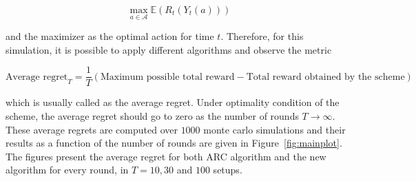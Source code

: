 \documentclass[11pt]{article}
\newcommand{\E}{\mathbb{E}}
\newcommand{\Acal}{\mathcal{A}}
\begin{document}
$$
\max_{a \in \Acal} \E(R_t(Y_t(a)))
$$

\noindent and the maximizer as the optimal action for time $t$. Therefore, for this simulation, it is possible to apply different algorithms and observe the metric 

$$
\text{Average regret}_T = \dfrac{1}{T} \left( \text{Maximum possible total reward} - \text{Total reward obtained by the scheme} \right)
$$

\noindent which is usually called as the average regret. Under optimality condition of the scheme, the average regret should go to zero as the number of rounds $T \rightarrow \infty$. These average regrets are computed over $1000$ monte carlo simulations and their results as a function of the number of rounds are given in Figure~\ref{fig:mainplot}. The figures present the average regret for both ARC algorithm and the new algorithm for every round, in $T = 10, 30$ and $100$ setups.
\end{document}
